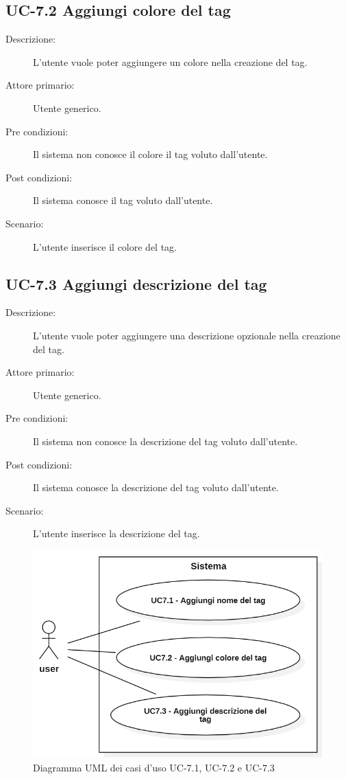 \subsection{UC-7.2 Aggiungi colore del tag}
\begin{description}
    \item[Descrizione:] L’utente vuole poter aggiungere un colore nella creazione del tag.
    \item[Attore primario:] Utente generico.
    \item[Pre condizioni:] Il sistema non conosce il colore il tag voluto dall’utente.
    \item[Post condizioni:] Il sistema conosce il tag voluto dall’utente.
    \item[Scenario:] L’utente inserisce il colore del tag.
\end{description}

\subsection{UC-7.3 Aggiungi descrizione del tag}
\begin{description}
    \item[Descrizione:] L’utente vuole poter aggiungere una descrizione opzionale nella creazione del tag.
    \item[Attore primario:] Utente generico.
    \item[Pre condizioni:] Il sistema non conosce la descrizione  del tag voluto dall’utente.
    \item[Post condizioni:] Il sistema conosce la descrizione del tag voluto dall’utente.
    \item[Scenario:] L’utente inserisce la descrizione del tag.
\end{description}
\begin{figure}[H]
    \centering
    \includegraphics[width=0.8\linewidth]{UC7.1-2-3.PNG}
    \caption{Diagramma UML dei casi d'uso UC-7.1, UC-7.2 e UC-7.3}
    \label{fig:UC7.1-2-3}
\end{figure}

